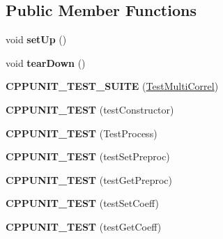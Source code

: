 \subsection*{Public Member Functions}
\begin{DoxyCompactItemize}
\item 
\mbox{\label{class_test_multi_correl_a4e22b8867839cdcea49d65426bfc1d22}} 
void {\bfseries set\+Up} ()
\item 
\mbox{\label{class_test_multi_correl_aef939f86105bce6af41ce36412bd9c17}} 
void {\bfseries tear\+Down} ()
\item 
\mbox{\label{class_test_multi_correl_a8a2ab2f41f0428bb7f33ae288ec558c3}} 
{\bfseries C\+P\+P\+U\+N\+I\+T\+\_\+\+T\+E\+S\+T\+\_\+\+S\+U\+I\+TE} (\mbox{\hyperlink{class_test_multi_correl}{Test\+Multi\+Correl}})
\item 
\mbox{\label{class_test_multi_correl_ab17a7080213cb99bbed9fd5d044cce14}} 
{\bfseries C\+P\+P\+U\+N\+I\+T\+\_\+\+T\+E\+ST} (test\+Constructor)
\item 
\mbox{\label{class_test_multi_correl_a7fa2734b7396813ad428012f4f43dc45}} 
{\bfseries C\+P\+P\+U\+N\+I\+T\+\_\+\+T\+E\+ST} (Test\+Process)
\item 
\mbox{\label{class_test_multi_correl_a8f714669e1a49f37622a8c71b9a34ab4}} 
{\bfseries C\+P\+P\+U\+N\+I\+T\+\_\+\+T\+E\+ST} (test\+Set\+Preproc)
\item 
\mbox{\label{class_test_multi_correl_a218695a9b353387715f54a654e5c9448}} 
{\bfseries C\+P\+P\+U\+N\+I\+T\+\_\+\+T\+E\+ST} (test\+Get\+Preproc)
\item 
\mbox{\label{class_test_multi_correl_a2f816b977dc3c2c41a93703307c8f715}} 
{\bfseries C\+P\+P\+U\+N\+I\+T\+\_\+\+T\+E\+ST} (test\+Set\+Coeff)
\item 
\mbox{\label{class_test_multi_correl_acc5be118398071374ddaa95bdf7176c1}} 
{\bfseries C\+P\+P\+U\+N\+I\+T\+\_\+\+T\+E\+ST} (test\+Get\+Coeff)
\item 

\end{DoxyCompactItemize}
